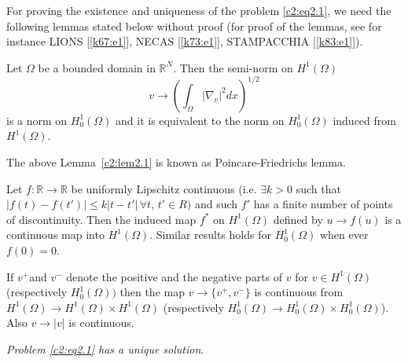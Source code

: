  For proving the existence and uniqueness of the problem
 \eqref{c2:eq2.1}, we 
 need the following lemmas stated below without proof (for proof of
 the lemmas, see for instance LIONS [\ref{k67:e1}], NECAS [\ref{k73:e1}],
 STAMPACCHIA [\ref{k83:e1}]).  
  
\begin{lemma}\label{c2:lem2.1}%
Let $\Omega$ be a bounded domain in $\mathbb{R}^N$. Then the semi-norm
on $H^1(\Omega)$  
$$
v \to \left( \int_\Omega |\nabla _v | ^2 dx \right) ^{1/2}
$$
is a norm on $H^1_0 (\Omega)$ and it is equivalent to the norm on
$H^1_0(\Omega)$ induced from $H^1(\Omega)$. 
\end{lemma}  
  
  The above Lemma~\ref{c2:lem2.1} is known as Poincare-Friedrichs lemma.
  
\begin{lemma}[STAMPACCHIA {[\ref{k83:e1}]}]\label{c2:lem2.2}%
  Let $f : \mathbb{R} \to \mathbb{R}$  be uniformly
  Lipschitz continuous  (i.e. $\exists k > 0$ such that $| f(t) -
  f(t') | \leq k | t - t'| \,\forall t$, $t' \in R)$ and such $f'$
  has a finite number of points of discontinuity. Then the induced map
  $f^*$  on $H^1(\Omega)$ defined by $u \to f (u) $ is a continuous
  map into $H^1(\Omega)$. Similar results holds for $H^1_0 (\Omega)$
  when ever $f (0) = 0$. 
  \end{lemma} 
  
\begin{corollary}\label{c2:cor2.1}%
If $v^+$\pageoriginale  and $v^-$ denote the positive and the negative parts of $v$
for $v \in H^1 (\Omega)$ (respectively $H^1_0(\Omega))$ then the
map $v \to \{v^+, v^- \}$ is continuous from $H^1 (\Omega) \to H^1
(\Omega ) \times H^1(\Omega) $ (respectively $H^1_0  (\Omega) \to
H^1_0 (\Omega) \times H^1_0 (\Omega)$). Also $v \to | v |$ is
continuous. 
\end{corollary}

\begin{theorem}\label{c2:thm2.1}%
{\em Problem \eqref{c2:eq2.1} has a unique solution}.
\end{theorem}

